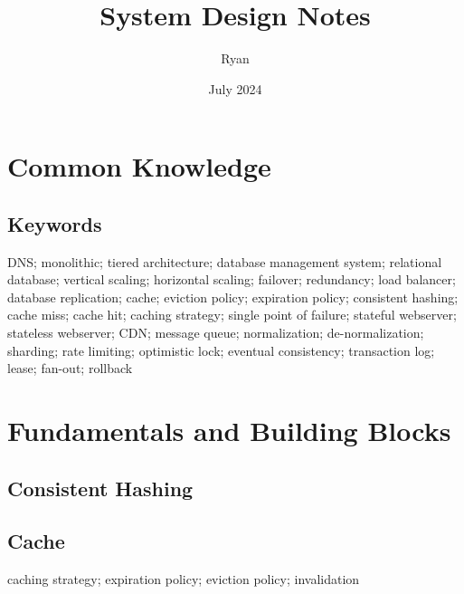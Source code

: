\documentclass[letterpaper, oneside]{book}
\title{System Design Notes}
\author{Ryan}
\date{July 2024}
\begin{document}
\maketitle{}
\tableofcontents


\part{Common Knowledge}


\chapter{Keywords}

DNS; monolithic; tiered architecture; database management system; relational database; vertical scaling; horizontal scaling; failover; redundancy; load balancer; database replication; cache; eviction policy; expiration policy; consistent hashing; cache miss; cache hit; caching strategy; single point of failure; stateful webserver; stateless webserver; CDN; message queue; normalization; de-normalization; sharding; rate limiting; optimistic lock; eventual consistency; transaction log; lease; fan-out; rollback

\part{Fundamentals and Building Blocks}



\chapter{Consistent Hashing}

\chapter{Cache}

caching strategy; expiration policy; eviction policy; invalidation
\end{document}
